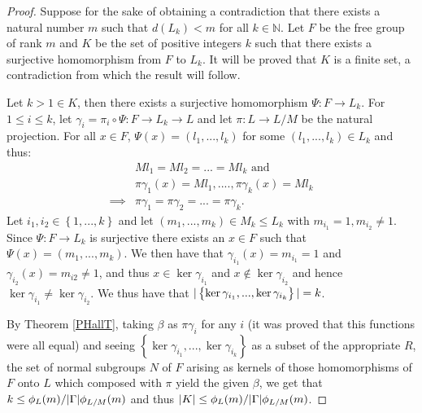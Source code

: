 \begin{proof}
    Suppose for the sake of obtaining a contradiction that there exists a natural number $m$ such that $d(L_k)<m$ for all $k \in \mathbb{N}$.
    Let $F$ be the free group of rank $m$ and $K$ be the set of positive integers $k$ such that there exists a surjective homomorphism from $F$ to $L_k$. 
    It will be proved that $K$ is a finite set, a contradiction from which the result will follow.

    Let $k > 1 \in K$, then there exists a surjective homomorphism $\Psi : F \rightarrow L_k$. For $1 \le i \le k$, let $\gamma_i = \pi_i \circ \Psi : F \rightarrow L_k \rightarrow L$ and let $\pi : L \rightarrow L/M$ be the natural projection. For all $x \in F$, $\Psi(x) = (l_1,...,l_k)$ for some $(l_1,...,l_k) \in L_k$ and thus:
    \begin{align*}
        &Ml_1 = Ml_2 = ... = Ml_k \text{ and } \\
        &\pi\gamma_1(x) = Ml_1, .... , \pi\gamma_k(x) = Ml_k \\
        \implies &\pi\gamma_1 = \pi\gamma_2 = ... = \pi\gamma_k.
    \end{align*}
    Let $i_1, i_2 \in \left\{ 1, ..., k \right\}$ and let $(m_1,..., m_k) \in M_k \le L_k$ with $m_{i_1} = 1, m_{i_2} \ne 1.$ Since $\Psi : F \rightarrow L_k$ is surjective there exists an $x \in F$ such that $\Psi(x) = (m_1,..., m_k)$. 
    We then have that $\gamma_{i_1}(x) = m_{i_1} = 1$ and $\gamma_{i_2}(x) = m_{i2} \ne 1$, and thus $x \in \ker \gamma_{i_1}$ and $x \notin \ker \gamma_{i_2}$ and hence $\ker \gamma_{i_1} \ne \ker \gamma_{i_2}$. We thus have that $| \left\{ \ker \gamma_{i_1}, ..., \ker \gamma_{i_k} \right\} | = k$. 
    
    By Theorem \ref{PHallT}, taking $\beta$ as $\pi\gamma_i$ for any $i$ (it was proved that this functions were all equal) and seeing $\left\{ \ker \gamma_{i_1}, ..., \ker \gamma_{i_k} \right\}$ as a subset of the appropriate $R$, the set of normal subgroups $N$ of $F$ arising as kernels of those homomorphisms of $F$ onto $L$ which composed with $\pi$ yield the given $\beta$, we get that $k \le \phi_L(m)/| \Gamma |\phi_{L/M}(m)$ and thus $| K | \le \phi_L(m)/| \Gamma |\phi_{L/M}(m)$.
\end{proof}
